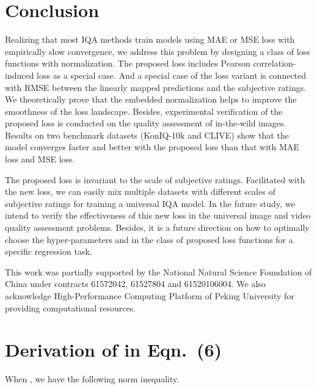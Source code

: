 \documentclass[sigconf]{acmart}
\begin{document}
\section{Conclusion}
\label{sec:conclusion}
Realizing that most IQA methods train models using MAE or MSE loss with empirically slow convergence, we address this problem by designing a class of loss functions with normalization.
The proposed loss includes Pearson correlation-induced loss as a special case.
And a special case of the loss variant is connected with RMSE between the linearly mapped predictions and the subjective ratings.
We theoretically prove that the embedded normalization helps to improve the smoothness of the loss landscape.
Besides, experimental verification of the proposed loss is conducted on the quality assessment of in-the-wild images.
Results on two benchmark datasets (KonIQ-10k and CLIVE) show that the model converges faster and better with the proposed loss than that with MAE loss and MSE loss.

The proposed loss is invariant to the scale of subjective ratings.
Facilitated with the new loss, we can easily mix multiple datasets with different scales of subjective ratings for training a universal IQA model.
In the future study, we intend to verify the effectiveness of this new loss in the universal image and video quality assessment problems.
Besides, it is a future direction on how to optimally choose the hyper-parameters  and  in the class of proposed loss functions for a specific regression task.

\begin{acks}
This work was partially supported by the National Natural Science Foundation of China under contracts 61572042, 61527804 and 61520106004. We also acknowledge High-Performance Computing Platform of Peking University for providing computational resources.
\end{acks}




\appendix


\section{Derivation of  in Eqn.~(6)}
\label{sec:supp_a}
\begin{lemma}
When , we have the following norm inequality.

\end{lemma}
\end{document}
